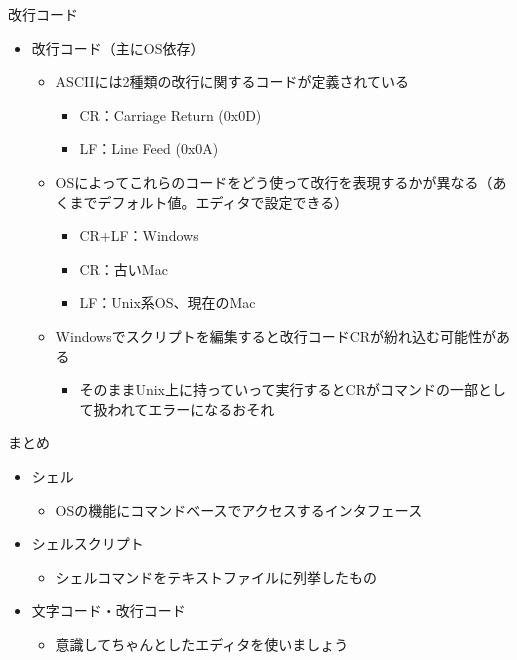\documentclass[12pt,aspectratio=169]{beamer}
\begin{document}
\begin{frame}{改行コード}
  \begin{itemize}
    \item 改行コード（主にOS依存）
      \begin{itemize}
        \item ASCIIには2種類の改行に関するコードが定義されている
          \begin{itemize}
            \item CR：Carriage Return (0x0D)
            \item LF：Line Feed (0x0A)
          \end{itemize}
        \item OSによってこれらのコードをどう使って改行を表現するかが異なる（あくまでデフォルト値。エディタで設定できる）
          \begin{itemize}
            \item CR+LF：Windows
            \item CR：古いMac
            \item LF：Unix系OS、現在のMac
          \end{itemize}
        \item Windowsでスクリプトを編集すると改行コードCRが紛れ込む可能性がある
          \begin{itemize}
            \item そのままUnix上に持っていって実行するとCRがコマンドの一部として扱われてエラーになるおそれ
          \end{itemize}

      \end{itemize}

  \end{itemize}

\end{frame}


\begin{frame}{まとめ}

  \begin{itemize}
    \item シェル
      \begin{itemize}
        \item OSの機能にコマンドベースでアクセスするインタフェース
      \end{itemize}
    \item シェルスクリプト
      \begin{itemize}
        \item シェルコマンドをテキストファイルに列挙したもの
      \end{itemize}
    \item 文字コード・改行コード
      \begin{itemize}
        \item 意識してちゃんとしたエディタを使いましょう
      \end{itemize}

  \end{itemize}


\end{frame}
\end{document}
